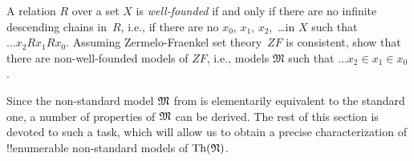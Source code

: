 \documentclass[../../../include/open-logic-section]{subfiles}
\begin{document}
\begin{prob}
A relation $R$ over a set $X$ is \emph{well-founded} if and only if
there are no infinite descending chains in~$R$, i.e., if there are no
$x_0$, $x_1$, $x_2$,~\dots in $X$ such that $\dots x_2Rx_1Rx_0$.  Assuming
Zermelo-Fraenkel set theory~$ZF$ is consistent, show that there are
non-well-founded models of $ZF$, i.e., models $\mathfrak{M}$ such that
$\dots x_2 \in x_1 \in x_0$.
\end{prob}

Since the non-standard model $\Struct{M}$ from  is
elementarily equivalent to the standard one, a number of properties of
$\Struct{M}$ can be derived. The rest of this section is devoted to
such a task, which will allow us to obtain a precise characterization
of !!{enumerable} non-standard models of $\Theory{N}$.
\end{document}
